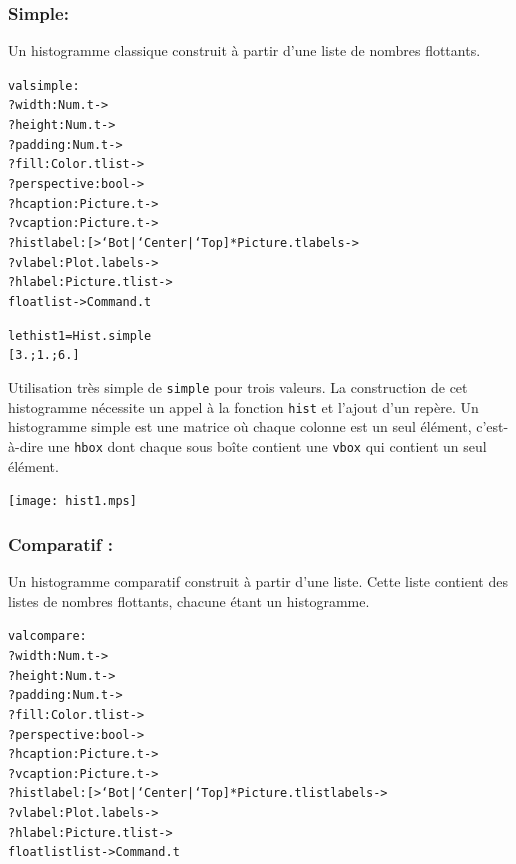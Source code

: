 \documentclass[a4paper,12pt]{article}
\begin{document}
\subsubsection{Simple:}
Un histogramme classique construit à partir d'une liste de nombres
flottants.
\begin{alltt}
  val simple :
  ?width:Num.t ->
  ?height:Num.t ->
  ?padding:Num.t ->
  ?fill:Color.t list ->
  ?perspective: bool ->
  ?hcaption:Picture.t ->
  ?vcaption:Picture.t ->
  ?histlabel:[> `Bot | `Center | `Top ] * Picture.t labels ->
  ?vlabel:Plot.labels ->
  ?hlabel:Picture.t list -> 
  float list -> Command.t
\end{alltt}

\bigskip

\begin{minipage}{0.5\linewidth}
  \begin{alltt}
    let hist1 = Hist.simple
    [3.;1.;6.]
  \end{alltt}

  Utilisation très simple de \texttt{simple} pour trois valeurs. La construction de cet histogramme nécessite un appel à la fonction \texttt{hist} et l'ajout d'un repère. Un histogramme simple est une matrice où chaque colonne est un seul élément, c'est-à-dire une \texttt{hbox} dont chaque sous boîte contient une \texttt{vbox} qui contient un seul élément.
\end{minipage}
\begin{minipage}{0.5\linewidth}
  \begin{center}
    \texttt{[image: hist1.mps]}
  \end{center}
\end{minipage}

\subsubsection{Comparatif :} 
Un histogramme comparatif construit à partir d'une liste. Cette liste
contient des listes de nombres flottants, chacune étant un histogramme.
\begin{alltt}
  val compare :
  ?width:Num.t ->
  ?height:Num.t ->
  ?padding:Num.t ->
  ?fill:Color.t list ->
  ?perspective: bool ->
  ?hcaption:Picture.t ->
  ?vcaption:Picture.t ->
  ?histlabel:[> `Bot | `Center | `Top ] * Picture.t list labels ->
  ?vlabel:Plot.labels ->
  ?hlabel:Picture.t list ->
  float list list -> Command.t
\end{alltt}

\bigskip
\end{document}
